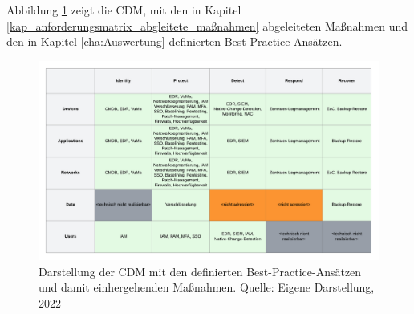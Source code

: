 \bigbreak
Abbildung \ref{fig:CDM-self} zeigt die CDM, mit den in Kapitel \ref{kap_anforderungsmatrix_abgleitete_maßnahmen} abgeleiteten Maßnahmen und den in Kapitel \ref{cha:Auswertung} definierten Best-Practice-Ansätzen.  

\begin{figure}[H]
    \centering
 \includegraphics[width=\linewidth]{images/uploads/a_figure_14.png}
  \caption{Darstellung der CDM mit den definierten Best-Practice-Ansätzen und damit einhergehenden Maßnahmen. Quelle: Eigene Darstellung, 2022}
  \label{fig:CDM-self}
\end{figure}
\bigbreak